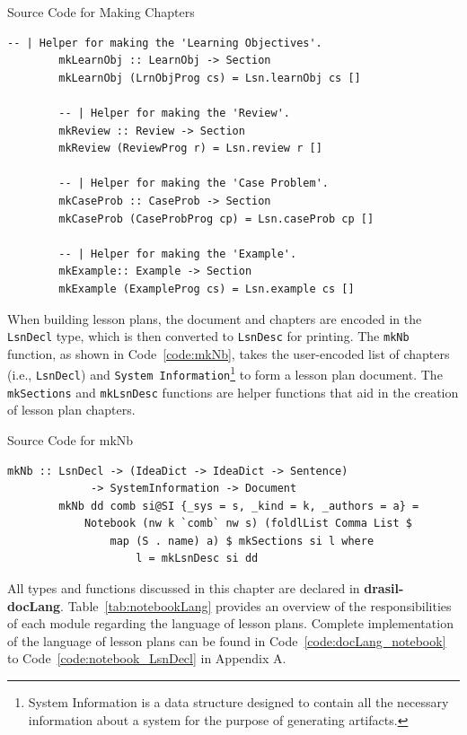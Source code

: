 \begin{listing}[h!]
	\caption{Source Code for Making Chapters} 
	\label{code:mkChapters}
	\begin{lstlisting}[language=haskell1]				
		-- | Helper for making the 'Learning Objectives'.
		mkLearnObj :: LearnObj -> Section
		mkLearnObj (LrnObjProg cs) = Lsn.learnObj cs []
		
		-- | Helper for making the 'Review'.
		mkReview :: Review -> Section
		mkReview (ReviewProg r) = Lsn.review r [] 
		
		-- | Helper for making the 'Case Problem'.
		mkCaseProb :: CaseProb -> Section
		mkCaseProb (CaseProbProg cp) = Lsn.caseProb cp [] 
		
		-- | Helper for making the 'Example'.
		mkExample:: Example -> Section
		mkExample (ExampleProg cs) = Lsn.example cs []
	\end{lstlisting}
\end{listing}

When building lesson plans, the document and chapters are encoded in the 
\texttt{LsnDecl} type, which is then converted to \texttt{LsnDesc} for 
printing. The \texttt{mkNb} function, as shown in Code~\ref{code:mkNb}, takes 
the user-encoded list of chapters (i.e., \texttt{LsnDecl}) and \texttt{System 
Information}\footnote{System Information is a data structure designed to 
contain all the necessary information about a system for the purpose of 
generating artifacts.} to form a lesson plan document. The \texttt{mkSections} 
and \texttt{mkLsnDesc} functions are helper functions that aid in the creation 
of lesson plan chapters.

\begin{listing}[h!]
	\caption{Source Code for mkNb}
	\label{code:mkNb}
	\begin{lstlisting}[language=haskell1]
		mkNb :: LsnDecl -> (IdeaDict -> IdeaDict -> Sentence) 
			 -> SystemInformation -> Document
		mkNb dd comb si@SI {_sys = s, _kind = k, _authors = a} =
			Notebook (nw k `comb` nw s) (foldlList Comma List $ 
				map (S . name) a) $	mkSections si l where
					l = mkLsnDesc si dd
	\end{lstlisting}
\end{listing}

All types and functions discussed in this chapter are declared in 
\textbf{drasil-docLang}. Table~\ref{tab:notebookLang} provides an overview of 
the responsibilities of each module regarding the language of lesson plans. 
Complete implementation of the language of lesson plans can be found in 
Code~\ref{code:docLang_notebook} to Code~\ref{code:notebook_LsnDecl} in 
Appendix A.

